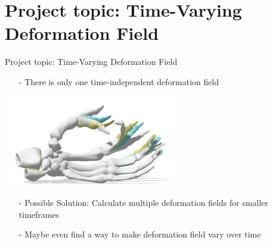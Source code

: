 \documentclass[xcolor=dvipsnames]{beamer}
\begin{document}
\section{Project topic: Time-Varying Deformation Field}
\begin{frame}{Project topic: Time-Varying Deformation Field}
\begin{enumerate}
\item[-] There is only one time-independent deformation field
\end{enumerate}
\begin{center}
\includegraphics[height=4cm]{Pictures/hand.png}
\end{center}
\begin{enumerate}
\item[-] Possible Solution: Calculate multiple deformation fields for smaller timeframes
\item[-] Maybe even find a way to make deformation field vary over time
\end{enumerate}
\end{frame}

\end{document}
